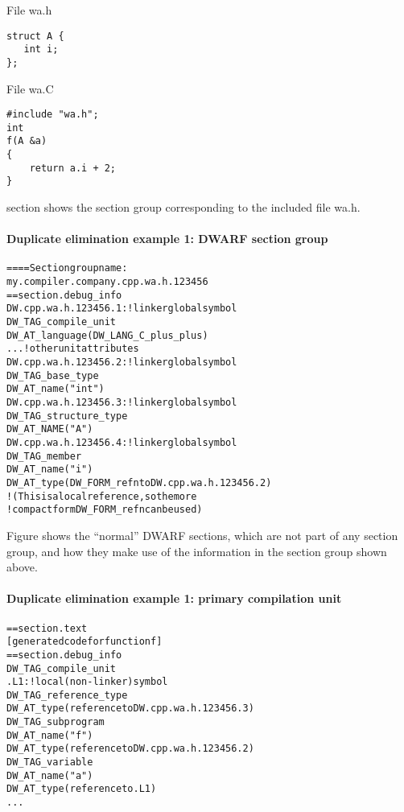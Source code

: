 File wa.h

\begin{lstlisting}
struct A {
   int i;
};
\end{lstlisting}

File wa.C

\begin{lstlisting}
#include "wa.h";
int
f(A &a)
{
    return a.i + 2;
}
\end{lstlisting}


section 
shows the section group corresponding to the included file 
wa.h.


\paragraph{Duplicate elimination example 1: DWARF section group} 

\label{app:duplicateeliminationexample1dwarfsectiongroup}

\begin{alltt}
==== Section group name:
    my.compiler.company.cpp.wa.h.123456
== section .debug\_info
DW.cpp.wa.h.123456.1: ! linker global symbol
    DW\_TAG\_compile\_unit
        DW\_AT\_language(DW\_LANG\_C\_plus\_plus)
        ...  ! other unit attributes
DW.cpp.wa.h.123456.2: ! linker global symbol
    DW\_TAG\_base\_type
        DW\_AT\_name("int")
DW.cpp.wa.h.123456.3: ! linker global symbol
    DW\_TAG\_structure\_type
        DW\_AT\_NAME("A")
DW.cpp.wa.h.123456.4: ! linker global symbol
        DW\_TAG\_member
        DW\_AT\_name("i")
        DW\_AT\_type(DW\_FORM\_refn to DW.cpp.wa.h.123456.2)
            ! (This is a local reference, so the more
            ! compact form DW\_FORM\_refn can be used)
\end{alltt}


Figure 
shows the ``normal'' DWARF sections, which are not part of
any section group, and how they make use of the information
in the section group shown above.

\paragraph{Duplicate elimination example 1: primary compilation unit} 
\label{app:duplicateeliminationexample1primarycompilationunit}
\begin{alltt}
== section .text
    [generated code for function f]
== section .debug\_info
    DW\_TAG\_compile\_unit
.L1:                   ! local (non-linker) symbol
        DW\_TAG\_reference\_type
            DW\_AT\_type(reference to DW.cpp.wa.h.123456.3)
        DW\_TAG\_subprogram
            DW\_AT\_name("f")
            DW\_AT\_type(reference to DW.cpp.wa.h.123456.2)
            DW\_TAG\_variable
                DW\_AT\_name("a")
                DW\_AT\_type(reference to .L1)
        ...
\end{alltt}

